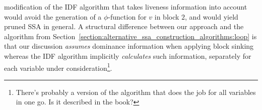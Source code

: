 modification of the IDF algorithm that takes liveness information into
account would avoid the generation of a $\phi$-function for $v$ in
block $2$, and would yield pruned SSA in general. A structural
difference between our approach and the algorithm from
Section~\ref{section:alternative_ssa_construction_algorithms:loop} is
that our discussion
\emph{assumes} dominance information when applying block sinking
whereas the IDF algorithm implicitly \emph{calculates} such
information, separately for each variable under
consideration\footnote{There's probably a version of the algorithm
that does the job for all variables in one go. Is it described in the
book?}.



